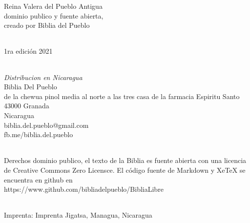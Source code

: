 \hfill\break
Reina Valera del Pueblo Antigua\\
dominio publico y fuente abierta,\\
creado por Biblia del Pueblo\\
\strut \\
1ra edición 2021\\
\strut \\
\emph{Distribucion en Nicaragua}\\
Biblia Del Pueblo\\
de la chewua pinol media al norte a las tres casa de la farmacia
Espiritu Santo\\
43000 Granada\\
Nicaragua\\
biblia.del.pueblo@gmail.com\\
fb.me/biblia.del.pueblo\\
\strut \\
Derechos dominio publico, el texto de la Biblia es fuente abierta con
una licencia de Creative Commons Zero Licensce. El código fuente de
Markdown y XeTeX se encuentra en github en\\
https://www.github.com/bibliadelpueblo/BibliaLibre\\
\strut \\
Imprenta: Imprenta Jigatsa, Managua, Nicaragua\\
